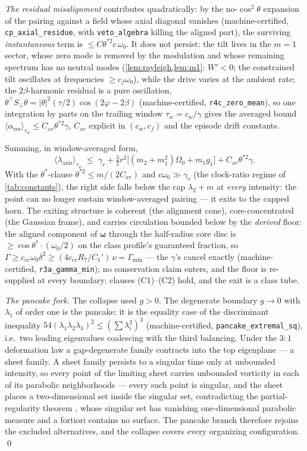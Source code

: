 \documentclass[11pt,letterpaper]{amsart}
\theoremstyle{definition}
\theoremstyle{remark}
\newcommand{\om}{\omega}
\newcommand{\vort}{\boldsymbol{\omega}}
\newcommand{\abs}[1]{\lvert #1 \rvert}
\begin{document}
\emph{The residual misalignment} contributes quadratically: by the no-$\cos^2\theta$
expansion of the pairing against a field whose axial diagonal vanishes
(machine-certified, \texttt{cp\_axial\_residue}, with
\texttt{veto\_algebra} killing the aligned part), the surviving
\emph{instantaneous} term is $\le C\theta^{*2}c\,\om_0$. It does not
persist: the tilt lives in the $m=1$ sector, whose zero mode is removed by the
modulation and whose remaining spectrum has no neutral modes
(\cref{lem:rayleigh,lem:m1}: $W'<0$; the constrained tilt oscillates at
frequencies $\ge c_f\om_0$), while the drive varies at the ambient rate; the
$2\beta$-harmonic residual is a pure oscillation,
$\theta^\top S_\perp\theta=\abs{\theta}^2(\tau/2)\cos(2\varphi-2\beta)$
(machine-certified, \texttt{r4c\_zero\_mean}), so one integration by parts on
the trailing window $\tau_w=c_w/\gamma$ gives the averaged bound
$\langle\alpha_{\mathrm{res}}\rangle_{\tau_w}\le C_{\mathrm{av}}\theta^{*2}\gamma$,
$C_{\mathrm{av}}$ explicit in $(c_w,c_f)$ and the episode drift constants.

Summing, in window-averaged form,
\[
\bigl\langle\lambda_{\mathrm{axis}}\bigr\rangle_{\tau_w}\;\le\;\gamma_r
+\tfrac32r^2\bigl[(m_2+m_1^2)\Omega_0+m_1g_1\bigr]+C_{\mathrm{av}}\theta^{*2}\gamma .
\]
With the $\theta^*$-clause $\theta^{*2}\le m/(2C_{\mathrm{av}})$ and
$c\om_0\gg\gamma_r$ (the clock-ratio regime of \cref{tab:constants}), the right
side falls below the cap $\lambda_2+m$ at \emph{every} intensity: the point can
no longer sustain window-averaged pairing --- it exits to the capped horn. The
exiting structure is coherent (the alignment cone), core-concentrated (the
Gaussian frame), and carries circulation bounded below by the \emph{derived}
floor: the aligned component of $\vort$ through the half-radius core disc is
$\ge\cos\theta^*\cdot(\om_0/2)$ on the class profile's guaranteed fraction, so
$\Gamma\ge c_{\mathrm{cc}}\om_0\delta^2\ge(4c_{\mathrm{cc}}R_7/C_1')\,\nu
=\Gamma_{\min}$ --- the $\gamma$'s cancel exactly (machine-certified,
\texttt{r3a\_gamma\_min}); no conservation claim enters, and the floor is
re-supplied at every boundary: clauses (C1)--(C2) hold, and the exit is a class
tube.

\emph{The pancake fork.} The collapse used $g>0$. The degenerate boundary $g\to0$
with $\lambda_1$ of order one is the pancake: it is the equality case of the
discriminant inequality $54(\lambda_1\lambda_2\lambda_3)^2\le(\sum\lambda_i^2)^3$
(machine-certified, \texttt{pancake\_extremal\_sq}), i.e.\ two leading eigenvalues
coalescing with the third balancing. Under the $3{:}1$ deformation law a
gap-degenerate family contracts into the top eigenplane --- a sheet family. A sheet
family persists to a singular time only at unbounded intensity, so every point of
the limiting sheet carries unbounded vorticity in each of its parabolic
neighborhoods --- every such point is singular, and the sheet places a
two-dimensional set inside the singular
set, contradicting the partial-regularity theorem \cite{CKN1982,Lin1998}, whose
singular set has vanishing one-dimensional parabolic measure and a fortiori contains
no surface. The pancake branch therefore rejoins the excluded alternatives, and the
collapse covers every organizing configuration. \qed
\end{document}

